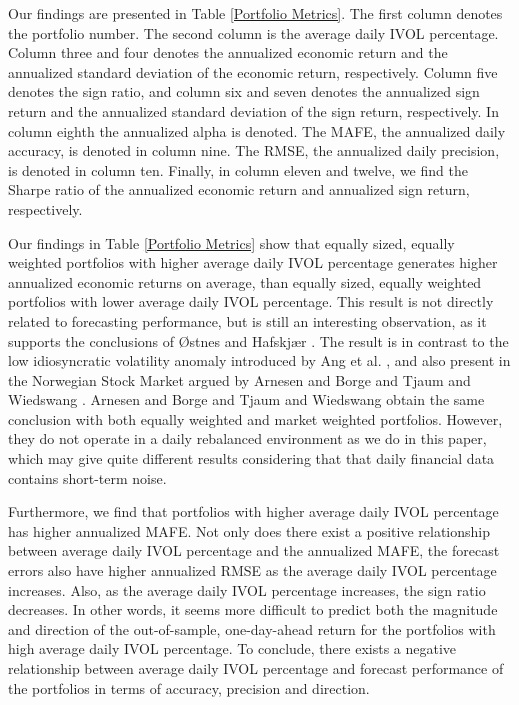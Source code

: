 Our findings are presented in Table \ref{Portfolio Metrics}. The first column denotes the portfolio number. The second column is the average daily IVOL percentage. Column three and four denotes the annualized economic return and the annualized standard deviation of the economic return, respectively. Column five denotes the sign ratio, and column six and seven denotes the annualized sign return and the annualized standard deviation of the sign return, respectively. In column eighth the annualized alpha is denoted. The MAFE, the annualized daily accuracy, is denoted in column nine. The RMSE, the annualized daily precision, is denoted in column ten. Finally, in column eleven and twelve, we find the Sharpe ratio of the annualized economic return and annualized sign return, respectively. 

Our findings in Table \ref{Portfolio Metrics} show that equally sized, equally weighted portfolios with higher average daily IVOL percentage generates higher annualized economic returns on average, than equally sized, equally weighted portfolios with lower average daily IVOL percentage. This result is not directly related to forecasting performance, but is still an interesting observation, as it supports the conclusions of Østnes and Hafskjær \cite{ostnes}. The result is in contrast to the low idiosyncratic volatility anomaly introduced by Ang et al. \cite{angetal06}, and also present in the Norwegian Stock Market argued by Arnesen and Borge \cite{arnborge} and Tjaum and Wiedswang \cite{thaumwiedswang}. Arnesen and Borge \cite{arnborge} and Tjaum and Wiedswang \cite{thaumwiedswang} obtain the same conclusion with both equally weighted and market weighted portfolios. However, they do not operate in a daily rebalanced environment as we do in this paper, which may give quite different results considering that that daily financial data contains short-term noise. 

Furthermore, we find that portfolios with higher average daily IVOL percentage has higher annualized MAFE. Not only does there exist a positive relationship between average daily IVOL percentage and the annualized MAFE, the forecast errors also have higher annualized RMSE as the average daily IVOL percentage increases. Also, as the average daily IVOL percentage increases, the sign ratio decreases. In other words, it seems more difficult to predict both the magnitude and direction of the out-of-sample, one-day-ahead return for the portfolios with high average daily IVOL percentage. To conclude, there exists a negative relationship between average daily IVOL percentage and forecast performance of the portfolios in terms of accuracy, precision and direction. 

